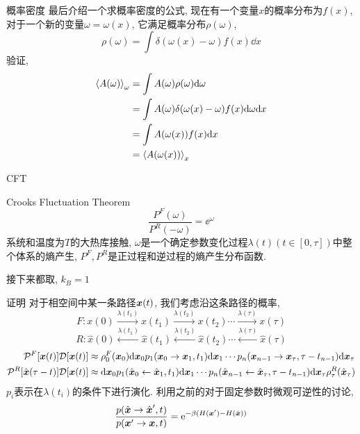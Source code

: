    \begin{frame}{概率密度}
        最后介绍一个求概率密度的公式, 现在有一个变量$x$的概率分布为$f(x)$, 对于一个新的变量$\omega = \omega(x)$, 它满足概率分布$\rho(\omega)$, 
        \begin{equation}
            \rho(\omega) = \int \delta(\omega(x) - \omega) f(x)\dd x
        \end{equation}
        验证,
        \begin{equation*}
            \begin{split}
                \expval{A(\omega)}_\omega &= \int A(\omega) \rho(\omega)\dd \omega\\
                &= \int A(\omega) \delta(\omega(x) - \omega) f(x)\dd\omega\dd x \\
                &= \int A(\omega(x))f(x)\dd x \\
                &= \expval{A(\omega(x))}_x
            \end{split}
        \end{equation*}
    \end{frame}
    \begin{frame}{CFT}
        \begin{alertblock}{Crooks Fluctuation Theorem}
            \begin{equation}
                \frac{P^F(\omega)}{P^R(-\omega)} = \ee^{\omega}
            \end{equation}
            系统和温度为$T$的大热库接触, $\omega$是一个确定参数变化过程$\lambda(t)(t\in[0,\tau])$中整个体系的熵产生, $P^F,P^R$是正过程和逆过程的熵产生分布函数.
        \end{alertblock}
        接下来都取, $k_B = 1$
    \end{frame}
    \begin{frame}{证明}
        对于相空间中某一条路径$\vb*x(t)$, 我们考虑沿这条路径的概率,
        $$
        F: x(0)\xrightarrow{\lambda(t_1)}x(t_1)\xrightarrow{\lambda(t_2)}x(t_2)\cdots \xrightarrow{\lambda(\tau)}x(\tau)
        $$
        $$
        R:  \hat x(0)\xleftarrow{\lambda(t_1)}\hat x(t_1)\xleftarrow{\lambda(t_2)}\hat x(t_2)\cdots \xleftarrow{\lambda(\tau)}\hat x(\tau)
        $$
        \begin{equation}
            \begin{split}
                \mathcal{P}^F[\vb*x(t)]\mathcal D[\vb*x(t)] &\approx\rho^F_0(\vb*x_0) \dd \vb*x_0p_1(\vb*x_0\to\vb*x_1,t_1)\dd\vb*x_1 \cdots p_n(\vb*x_{n-1}\to\vb*x_\tau,\tau-t_{n-1})\dd\vb*x_\tau\\
                \mathcal{P}^R[\hat{\vb*x}(\tau-t)]\mathcal D[\vb*x(t)] &\approx \dd\vb*x_0p_1(\hat{\vb*x}_0\leftarrow\hat{\vb*x}_1,t_1)\dd\vb*x_1 \cdots p_n(\hat{\vb*x}_{n-1}\leftarrow\hat{\vb*x}_\tau,\tau-t_{n-1})\dd\vb*x_\tau\rho^R_\tau(\hat{\vb*x}_\tau)
            \end{split}
        \end{equation}
        $p_i$表示在$\lambda(t_i)$的条件下进行演化. 利用之前的对于固定参数时微观可逆性的讨论,
        \[\dfrac{p(\hat{\vb*x}\to\hat{\vb*x}',t)}{p(\vb*x'\to\vb*x,t)} = \mathrm{e}^{-\beta(H(\vb*x') - H(\hat{\vb*x}))}
            \]
    \end{frame}
